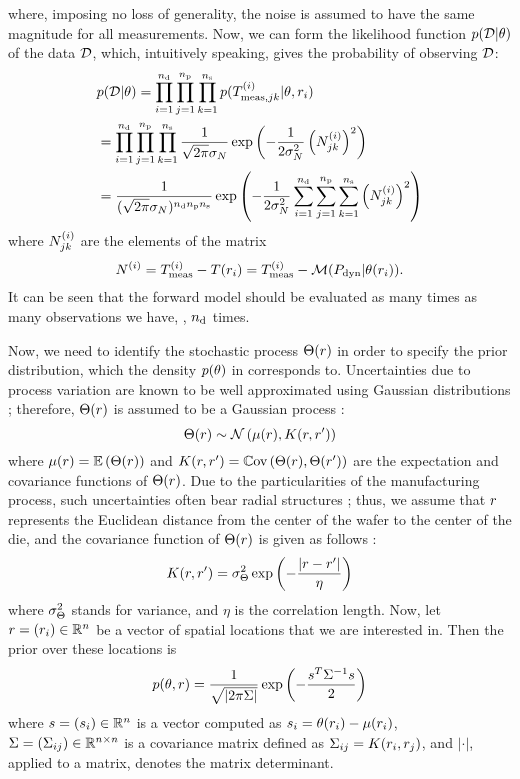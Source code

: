 where, imposing no loss of generality, the noise is assumed to have the same magnitude for all measurements. Now, we can form the likelihood function $\f{\data | \u}$ of the data $\mathcal{D}$, which, intuitively speaking, gives the probability of observing $\mathcal{D}$:
\begin{align*}
  & \f{\data | \u} = \prod_{i = 1}^{\ndata} \prod_{j = 1}^{\ncores} \prod_{k = 1}^{\nsteps} \f{\mT^{(i)}_{\meas, jk} | \u, \r_i} \\
  & = \prod_{i = 1}^{\ndata} \prod_{j = 1}^{\ncores} \prod_{k = 1}^{\nsteps} \frac{1}{\sqrt{2 \pi} \sigma_\noise} \exp\left( -\frac{1}{2 \sigma^2_\noise} \left(\noise_{jk}^{(i)}\right)^2 \right) \\
  & = \frac{1}{(\sqrt{2 \pi} \sigma_\noise)^{\ndata \ncores \nsteps}} \exp\left( -\frac{1}{2 \sigma^2_\noise} \sum_{i = 1}^{\ndata} \sum_{j = 1}^{\ncores} \sum_{k = 1}^{\nsteps} \left(\noise_{jk}^{(i)}\right)^2 \right)
\end{align*}
where $N^{(i)}_{jk}$ are the elements of the matrix
\[
  N^{(i)} = T^{(i)}_{\text{meas}} - T(r_i) = T^{(i)}_{\text{meas}} - \mathcal{M}( P_{\text{dyn}} | \theta(r_i) ).
\]
It can be seen that the forward model should be evaluated as many times as many observations we have, \ie, $n_\text{d}$ times.

Now, we need to identify the stochastic process $\Theta(r)$ in order to specify the prior distribution, which the density $\f{\u}$ in  corresponds to. Uncertainties due to process variation are known to be well approximated using Gaussian distributions \cite{srivastava2010}; therefore, $\Theta(r)$ is assumed to be a Gaussian process \cite{rasmussen2006}:
\[
  \U(\r) \sim \gaussianp{\fMean{\r}}{\fCov{\r, \r'}}
\]
where $\fMean{\r} = \E{\U(\r)}$ and $\fCov{\r, \r'} = \Cov{\U(\r), \U(\r')}$ are the expectation and covariance functions of $\Theta(r)$. Due to the particularities of the manufacturing process, such uncertainties often bear radial structures \cite{cheng2011}; thus, we assume that $r$ represents the Euclidean distance from the center of the wafer to the center of the die, and the covariance function of $\Theta(r)$ is given as follows \cite{maitre2010}:
\begin{equation} \elabel{covariance-function}
  \fCov{\r, \r'} = \sigma^2_\U \exp\left(-\frac{|\r - \r'|}{\eta}\right)
\end{equation}
where $\sigma^2_\Theta$ stands for variance, and $\eta$ is the correlation length. Now, let $r = (r_i) \in \mathbb{R}^n$ be a vector of spatial locations that we are interested in. Then the prior over these locations is
\[
  \f{\u, \r} = \frac{1}{\sqrt{|2 \pi \mCov|}} \exp\left(-\frac{s^T \mCov^{-1} s}{2} \right)
\]
where $s = (s_i) \in \mathbb{R}^n$ is a vector computed as $s_i = \u(\r_i) - \fMean{\r_i}$, $\Sigma = (\Sigma_{ij}) \in \mathbb{R}^{n \times n}$ is a covariance matrix defined as $\mCov_{ij} = \fCov{\r_i, \r_j}$, and $|\cdot|$, applied to a matrix, denotes the matrix determinant.
